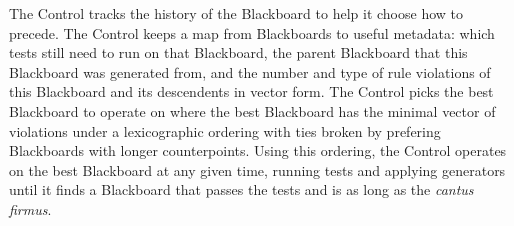 The Control tracks the history of the Blackboard to help it choose how to precede.
The Control keeps a map from Blackboards to useful metadata: 
  which tests still need to run on that Blackboard,
  the parent Blackboard that this Blackboard was generated from,
  and the number and type of rule violations of this Blackboard and its descendents in vector form.
The Control picks the best Blackboard to operate on 
  where the best Blackboard has the minimal vector of violations under a lexicographic ordering 
  with ties broken by prefering Blackboards with longer counterpoints.
Using this ordering, the Control operates on the best Blackboard at any given time, 
  running tests and applying generators until it finds a Blackboard that passes the tests and is as long as the \emph{cantus firmus}.

